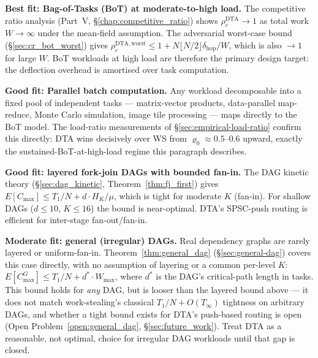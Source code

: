 \documentclass[11pt,a4paper]{report}
\begin{document}
\medskip
\noindent\textbf{Best fit: Bag-of-Tasks (BoT) at moderate-to-high load.}
The competitive ratio analysis (Part~V, \S\ref{chap:competitive_ratio}) shows
$\rho_c^{\mathrm{DTA}} \to 1$ as total work $W \to \infty$ under the
mean-field assumption.  The adversarial worst-case bound
(\S\ref{sec:cr_bot_worst}) gives $\rho_c^{\mathrm{DTA,worst}} \leq
1 + N\lfloor N/2\rfloor\delta_{\mathrm{hop}}/W$, which is also $\to 1$
for large $W$.  BoT workloads at high load are therefore the primary
design target: the deflection overhead is amortised over task computation.

\medskip
\noindent\textbf{Good fit: Parallel batch computation.}
Any workload decomposable into a fixed pool of independent tasks
--- matrix-vector products, data-parallel map-reduce, Monte Carlo
simulation, image tile processing --- maps directly to the BoT model.
The load-ratio measurements of \S\ref{sec:empirical-load-ratio} confirm
this directly: DTA wins decisively over WS from $\varrho_0 \approx
0.5$--$0.6$ upward, exactly the sustained-BoT-at-high-load regime this
paragraph describes.

\medskip
\noindent\textbf{Good fit: layered fork-join DAGs with bounded fan-in.}
The DAG kinetic theory (\S\ref{sec:dag_kinetic}, Theorem~\ref{thm:fj_first})
gives $E[C_{\max}] \leq T_1/N + d \cdot H_K/\mu$, which is tight
for moderate $K$ (fan-in).  For shallow DAGs ($d \leq 10$, $K \leq 16$)
the bound is near-optimal.  DTA's SPSC-push routing is efficient for
inter-stage fan-out/fan-in.

\medskip
\noindent\textbf{Moderate fit: general (irregular) DAGs.}
Real dependency graphs are rarely layered or uniform-fan-in.
Theorem~\ref{thm:general_dag} (\S\ref{sec:general-dag}) covers this
case directly, with no assumption of layering or a common per-level
$K$: $E[C_{\max}^G] \leq T_1/N + d^*\cdot W_{\max}$, where $d^*$ is
the DAG's critical-path length in tasks. This bound holds for
\emph{any} DAG, but is looser than the layered bound above --- it does
not match work-stealing's classical $T_1/N + O(T_\infty)$ tightness on
arbitrary DAGs, and whether a tight bound exists for DTA's push-based
routing is open (Open Problem~\ref{open:general_dag},
\S\ref{sec:future_work}). Treat DTA as a reasonable, not optimal,
choice for irregular DAG workloads until that gap is closed.
\end{document}
